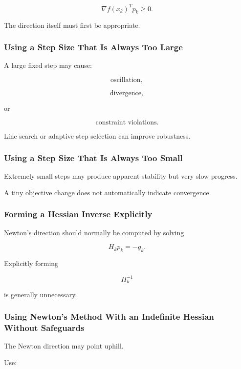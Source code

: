 \[
\boxed{
\nabla f(x_k)^Tp_k\geq0.
}
\]

The direction itself must first be appropriate.

\subsubsection{Using a Step Size That Is Always Too Large}

A large fixed step may cause:

\[
\boxed{
\text{oscillation},
}
\]

\[
\boxed{
\text{divergence},
}
\]

or

\[
\boxed{
\text{constraint violations}.
}
\]

Line search or adaptive step selection can improve robustness.

\subsubsection{Using a Step Size That Is Always Too Small}

Extremely small steps may produce apparent stability but very slow
progress.

A tiny objective change does not automatically indicate convergence.

\subsubsection{Forming a Hessian Inverse Explicitly}

Newton's direction should normally be computed by solving

\[
\boxed{
H_kp_k=-g_k.
}
\]

Explicitly forming

\[
H_k^{-1}
\]

is generally unnecessary.

\subsubsection{Using Newton's Method With an Indefinite Hessian Without Safeguards}

The Newton direction may point uphill.

Use:

